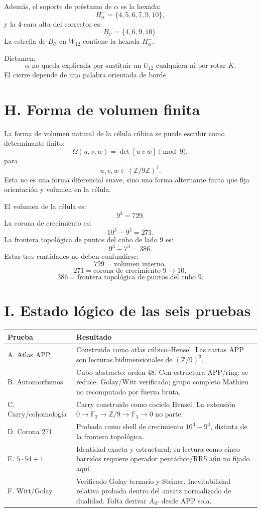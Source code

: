\documentclass[11pt,a4paper]{article}
\theoremstyle{definition}\newtheorem{definicion}[teorema]{Definici\'on}
\theoremstyle{remark}\newtheorem{observacion}[teorema]{Observaci\'on}
\newcommand{\F}{\mathbb F}
\newcommand{\Z}{\mathbb Z}
\begin{document}
Adem\'as, el soporte de pr\'estamo de \(\alpha\) es la hexada:
\[
H^-_\alpha=\{4,5,6,7,9,10\},
\]
y la 4-cara alta del corrector es:
\[
B_{\mathcal C}=\{4,6,9,10\}.
\]
La estrella de \(B_{\mathcal C}\) en \(W_{12}\) contiene la hexada \(H^-_\alpha\).

Dictamen:
\[
\boxed{\alpha\text{ no queda explicada por sustituir un }U_{12}\text{ cualquiera ni por rotar }K.}
\]
El cierre depende de una palabra orientada de borde.

\section{H. Forma de volumen finita}

La forma de volumen natural de la c\'elula c\'ubica se puede escribir como determinante finito:
\[
\Omega(u,v,w)=\det[u\ v\ w]\pmod9,
\]
para
\[
 u,v,w\in(\Z/9\Z)^3.
\]
Esta no es una forma diferencial suave, sino una forma alternante finita que fija orientaci\'on y volumen en la c\'elula.

El volumen de la c\'elula es:
\[
9^3=729.
\]
La corona de crecimiento es:
\[
10^3-9^3=271.
\]
La frontera topol\'ogica de puntos del cubo de lado 9 es:
\[
9^3-7^3=386.
\]
Estas tres cantidades no deben confundirse:
\[
729=\text{volumen interno},
\]
\[
271=\text{corona de crecimiento }9\to10,
\]
\[
386=\text{frontera topol\'ogica de puntos del cubo }9.
\]

\section{I. Estado l\'ogico de las seis pruebas}

\begin{longtable}{@{}p{3.4cm}p{10.4cm}@{}}
\toprule
\textbf{Prueba} & \textbf{Resultado}\\
\midrule
A. Atlas APP & Construido como atlas c\'ubico--Hensel. Las cartas APP son lecturas bidimensionales de \((\Z/9)^3\).\\
B. Automorfismos & Cubo abstracto: orden 48. Con estructura APP/ring: se reduce. Golay/Witt verificado; grupo completo Mathieu no recomputado por fuerza bruta.\\
C. Carry/cohomolog\'ia & Carry construido como cociclo Hensel. La extensi\'on \(0\to\F_3\to\Z/9\to\F_3\to0\) no parte.\\
D. Corona 271 & Probada como shell de crecimiento \(10^3-9^3\), distinta de la frontera topol\'ogica.\\
E. \(5\cdot54+1\) & Identidad exacta y estructural; su lectura como cinco barridos requiere operador pent\'adico/RR5 a\'un no fijado aqu\'i.\\
F. Witt/Golay & Verificado Golay ternario y Steiner. Inevitabilidad relativa probada dentro del ansatz normalizado de dualidad. Falta derivar \(A_W\) desde APP sola.\\
\bottomrule
\end{longtable}
\end{document}
